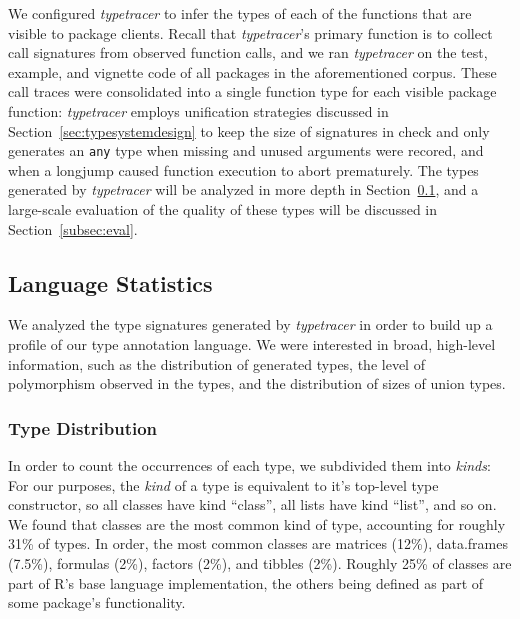 \documentclass[acmsmall,review,anonymous]{acmart}\settopmatter{printfolios=true,printccs=false,printacmref=false}
\newcommand{\code}[1]{{\lstinline[style=Rin]!#1!}\xspace}
\newcommand{\typetracer}{\emph{typetracer}\xspace} %
\begin{document}
We configured \typetracer to infer the types of each of the functions that are visible to package clients.
Recall that \typetracer's primary function is to collect call signatures from observed function calls, and we ran \typetracer on the test, example, and vignette code of all packages in the aforementioned corpus.
These call traces were consolidated into a single function type for each visible package function:
\typetracer employs unification strategies discussed in Section~\ref{sec:typesystemdesign} to keep the size of signatures in check and only generates an \code{any} type when missing and unused arguments were recored, and when a longjump caused function execution to abort prematurely.
The types generated by \typetracer will be analyzed in more depth in Section~\ref{subsec:stats}, and a large-scale evaluation of the quality of these types will be discussed in Section~\ref{subsec:eval}.

%
%
%
%
\subsection{Language Statistics}
\label{subsec:stats}

We analyzed the type signatures generated by \typetracer in order to build up a profile of our type annotation language.
We were interested in broad, high-level information, such as the distribution of generated types, the level of polymorphism observed in the types, and the distribution of sizes of union types.

%
%
\subsubsection{Type Distribution}


In order to count the occurrences of each type, we subdivided them into {\it kinds}: 
For our purposes, the {\it kind} of a type is equivalent to it's top-level type constructor, so all classes have kind ``class'', all lists have kind ``list'', and so on.
We found that classes are the most common kind of type, accounting for roughly 31\% of types.
In order, the most common classes are matrices (12\%), data.frames (7.5\%), formulas (2\%), factors (2\%), and tibbles (2\%).
Roughly 25\% of classes are part of R's base language implementation, the others being defined as part of some package's functionality.
\end{document}
